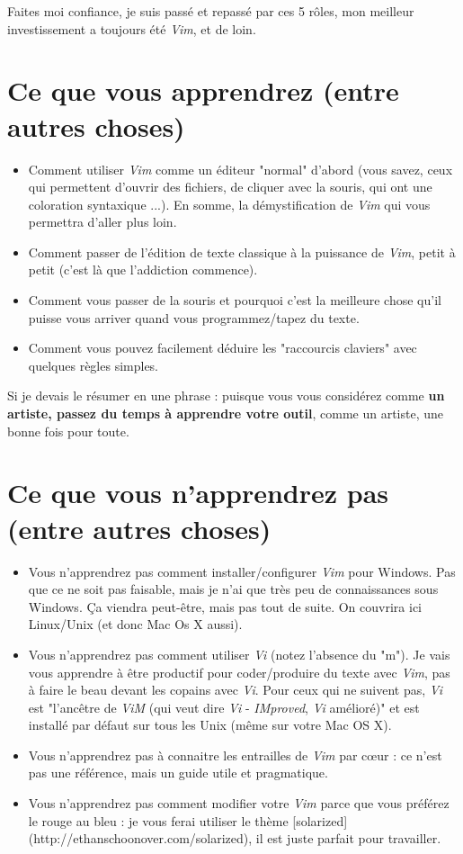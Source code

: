 Faites moi confiance, je suis passé et repassé par ces 5 rôles, mon meilleur investissement a toujours été \emph{Vim}, et de loin.

\section{Ce que vous apprendrez (entre autres choses)}

\begin{itemize}
    \item Comment utiliser \emph{Vim} comme un éditeur "normal" d'abord (vous savez, ceux qui permettent d'ouvrir des fichiers, de cliquer avec la souris, qui ont une coloration syntaxique ...). En somme, la démystification de \emph{Vim} qui vous permettra d'aller plus loin.
    \item Comment passer de l'édition de texte classique à la puissance de \emph{Vim}, petit à petit (c'est là que l'addiction commence).
    \item Comment vous passer de la souris et pourquoi c'est la meilleure chose qu'il puisse vous arriver quand vous programmez/tapez du texte.
    \item Comment vous pouvez facilement déduire les "raccourcis claviers" avec quelques règles simples.
\end{itemize}

Si je devais le résumer en une phrase : puisque vous vous considérez comme {\bf un artiste, passez du temps à apprendre votre outil}, comme un artiste, une bonne fois pour toute.

\section{Ce que vous n'apprendrez pas (entre autres choses)}

\begin{itemize}
    \item Vous n'apprendrez pas comment installer/configurer {\em Vim} pour Windows. Pas que ce ne soit pas faisable, mais je n'ai que très peu de connaissances sous Windows. Ça viendra peut-être, mais pas tout de suite. On couvrira ici Linux/Unix (et donc Mac Os X aussi).
    \item Vous n'apprendrez pas comment utiliser \emph{Vi} (notez l'absence du "m"). Je vais vous apprendre à être productif pour coder/produire du texte avec \emph{Vim}, pas à faire le beau devant les copains avec \emph{Vi}. Pour ceux qui ne suivent pas, \emph{Vi} est "l'ancêtre de \emph{ViM} (qui veut dire \emph{Vi} - \emph{IMproved}, \emph{Vi} amélioré)" et est installé par défaut sur tous les Unix (même sur votre Mac OS X).
    \item Vous n'apprendrez pas à connaitre les entrailles de \emph{Vim} par c\oe ur : ce n'est pas une référence, mais un guide utile et pragmatique.
    \item Vous n'apprendrez pas comment modifier votre \emph{Vim} parce que vous préférez le rouge au bleu : je vous ferai utiliser le thème [solarized](http://ethanschoonover.com/solarized), il est juste parfait pour travailler.
\end{itemize}

